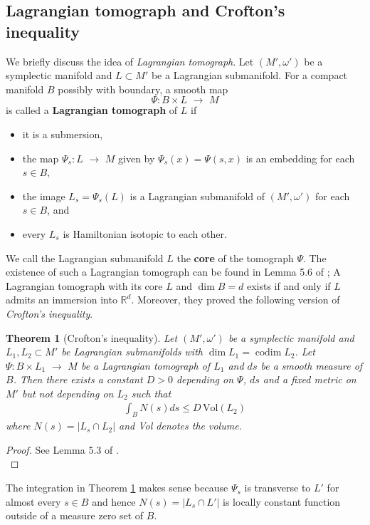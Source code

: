 \documentclass[12pt]{amsart}
\newtheorem{theorem}{Theorem}[section]
\theoremstyle{definition}
\newcommand{\RR}{{\mathbb R}}
\newcommand{\lr}{{\,\,\longrightarrow\,\,}}
\begin{document}
\subsection{Lagrangian tomograph and Crofton's inequality}
We briefly discuss the idea of \textit{Lagrangian tomograph}. Let $(M',\omega')$ be a symplectic manifold and $L \subset M'$ be a Lagrangian submanifold. For a compact manifold $B$ possibly with boundary, a smooth map $$\Psi : B \times L \lr M$$ is called a \textbf{Lagrangian tomograph} of $L$ if \vspace{0.1 cm}
\begin{itemize}
    \item it is a submersion,\vspace{0.2 cm}
    \item the map $\Psi_s : L \lr M$ given by $  \Psi_s(x) = \Psi(s,x)$ is an embedding for each $s \in B$, \vspace{0.2 cm}
    \item the image $L_s = \Psi_s(L)$ is a Lagrangian submanifold of $(M',\omega')$ for each $s \in B$, and\vspace{0.2 cm}
    \item every $L_s$ is Hamiltonian isotopic to each other.\vspace{0.1 cm}
\end{itemize}
We call the Lagrangian submanifold $L$ the \textbf{core} of the tomograph $\Psi$. The existence of such a Lagrangian tomograph can be found in Lemma 5.6 of \cite{cgg}; A Lagrangian tomograph with its core $L$ and $\dim B = d$ exists if and only if $L$ admits an immersion into $\RR^d$. Moreover, they proved the following version of \textit{Crofton's inequality}.
\begin{theorem}[Crofton's inequality]\label{crof}
    Let $(M',\omega')$ be a symplectic manifold and $L_1, L_2 \subset M'$ be Lagrangian submanifolds with $\dim L_1=\operatorname{codim} L_2 $. Let $\Psi : B \times L_1 \lr M$ be a Lagrangian tomograph of $L_1$ and $ds$ be a smooth measure of $B$. Then there exists a constant $D >0$ depending on $\Psi$, $ds$ and a fixed metric on $M'$ but not depending on $L_2$ such that
    \begin{align*}
        \int_B N(s) ds \leq D\, \textrm{Vol}(L_2)
    \end{align*}
    where $N(s) = | L_s \cap L_2|$ and Vol denotes the volume.
\end{theorem}
\begin{proof}
    See Lemma 5.3 of \cite{cgg}.\\
\end{proof}
The integration in Theorem \ref{crof} makes sense because $\Psi_s$ is transverse to $L'$ for almost every $s \in B$ and hence $N(s) = | L_s \cap L'|$ is locally constant function outside of a measure zero set of $B$.
\end{document}

